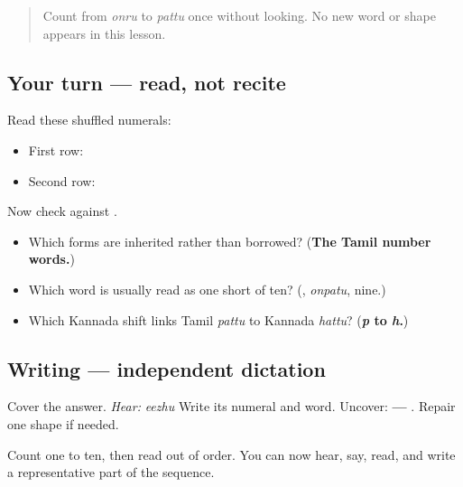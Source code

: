 \label{lesson:TA-C07-numbers-practice}



\begin{quote}
Count from \emph{onru} to \emph{pattu} once without looking. No new word or shape appears in this lesson.
\end{quote}

\subsection*{Your turn — read, not recite}
Read these shuffled numerals:

\begin{itemize}
\raggedright
  \item First row: \textbf{    }
  \item Second row: \textbf{    }
\end{itemize}

Now check against \textbf{         }.

\begin{culture}
\begin{itemize}
\raggedright
  \item Which forms are inherited rather than borrowed? (\textbf{The Tamil number words.})
  \item Which word is usually read as one short of ten? (\textbf{}, \emph{onpatu}, nine.)
  \item Which Kannada shift links Tamil \emph{pattu} to Kannada \emph{hattu}? (\textbf{\emph{p} to \emph{h}.})
\end{itemize}
\end{culture}

\subsection*{Writing — independent dictation}
Cover the answer. \emph{Hear:} \emph{eezhu} Write its numeral and word. Uncover: \textbf{ — }. Repair one shape if needed.

\begin{tcolorbox}[breakable,colback=teal!4,colframe=teal!35!black,title={Before you move on}]
Count one to ten, then read \textbf{  } out of order. You can now hear, say, read, and write a representative part of the sequence.
\end{tcolorbox}
